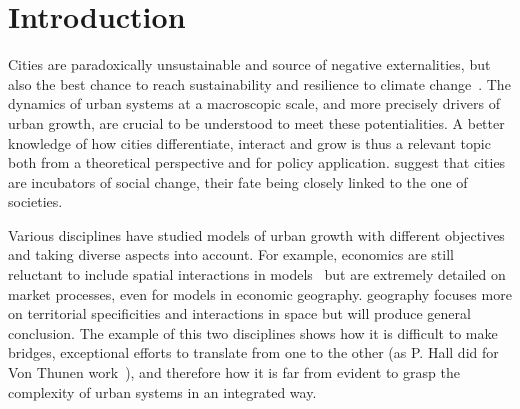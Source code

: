 \documentclass[Royal,sageh,times]{sagej}
\begin{document}

\maketitle







\section*{Introduction}


Cities are paradoxically  unsustainable and source of negative externalities, but also the best chance to reach sustainability and resilience to climate change~\citep{glaeser2011triumph}. The dynamics of urban systems at a macroscopic scale, and more precisely drivers of urban growth, are crucial  to be understood to meet these potentialities. A better knowledge of how cities differentiate, interact and grow is thus a relevant topic both from a theoretical perspective and for policy application.  \cite{pumain2009innovation} suggest that cities are incubators of social change, their fate being closely linked to the one of societies. 

Various disciplines have studied models of urban growth with different objectives and taking diverse aspects into account. For example, economics are still reluctant to include spatial interactions in  models~\citep{krugman1998space} but are extremely detailed on market processes, even for models in economic geography.   geography focuses more on territorial specificities and interactions in space but will  produce general conclusion. The example of this two disciplines  shows how it is difficult to make bridges,  exceptional efforts to translate from one to the other (as P. Hall did for Von Thunen work~\citep{taylor2016polymath}), and therefore how it is far from evident to grasp the complexity of urban systems in an integrated way.
\end{document}
